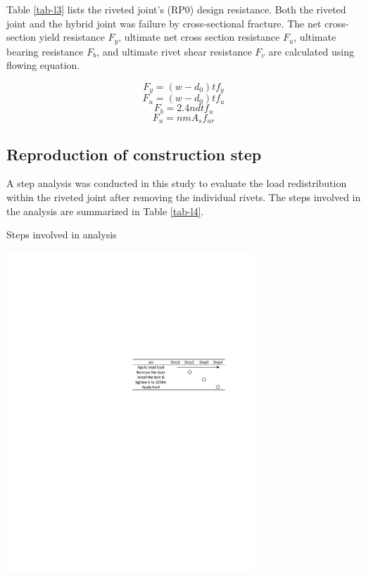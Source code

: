 Table \ref{tab-l3} lists the riveted joint’s (RP0) design resistance. Both the riveted joint and the hybrid joint was failure by cross-sectional fracture. The net cross-section yield resistance $F_{y}$, ultimate net cross section resistance $F_{u}$, ultimate bearing resistance $F_{b}$, and ultimate rivet shear resistance $F_v$ are calculated using flowing equation.

\begin{equation*}
    F_y = (w-d_0)tf_y
\end{equation*}
\begin{equation*}
    F_u = (w-d_0)tf_u
\end{equation*}
\begin{equation*}
    F_b = 2.4ndtf_u
\end{equation*}
\begin{equation*}
    F_u = nmA_sf_{ur}
\end{equation*}

\subsection{Reproduction of construction step}
A step analysis was conducted in this study to evaluate the load redistribution within the riveted joint after removing the individual rivets. The steps involved in the analysis are summarized in Table \ref{tab-l4}.

\begin{table}[htbp]
    \centering
    \caption{Steps involved in analysis}\label{tab-l4}
    \includegraphics[width=0.7\textwidth]{imgs/ch4/tab-l4.pdf}
\end{table}

